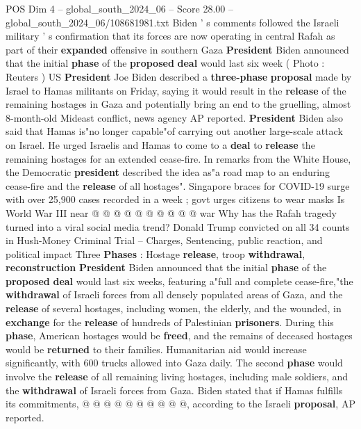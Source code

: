 \begin{textsample}{POS Dim 4 – global\_south\_2024\_06 – Score 28.00 – global\_south\_2024\_06/108681981.txt}  \label{ex:f4_pos_081}
Biden ' s comments followed the Israeli military ' s confirmation that its forces are now operating in central Rafah as part of their \textbf{expanded} offensive in southern Gaza \textbf{President} Biden announced that the initial \textbf{phase} of the \textbf{proposed} \textbf{deal} would last six week ( Photo : Reuters ) US \textbf{President} Joe Biden described a \textbf{three-phase} \textbf{proposal} made by Israel to Hamas militants on Friday, saying it would result in the \textbf{release} of the remaining hostages in Gaza and potentially bring an end to the gruelling, almost 8-month-old Mideast conflict, news agency AP reported. \textbf{President} Biden also said that Hamas is"no longer capable"of carrying out another large-scale attack on Israel.
He urged Israelis and Hamas to come to a \textbf{deal} to \textbf{release} the remaining hostages for an extended cease-fire.
In remarks from the White House, the Democratic \textbf{president} described the idea as"a road map to an enduring cease-fire and the \textbf{release} of all hostages".
Singapore braces for COVID-19 surge with over 25,900 cases recorded in a week ; govt urges citizens to wear masks Is World War III near @ @ @ @ @ @ @ @ @ @ war Why has the Rafah tragedy turned into a viral social media trend?
Donald Trump convicted on all 34 counts in Hush-Money Criminal Trial -- Charges, Sentencing, public reaction, and political impact Three \textbf{Phases} : Hostage \textbf{release}, troop \textbf{withdrawal}, \textbf{reconstruction} \textbf{President} Biden announced that the initial \textbf{phase} of the \textbf{proposed} \textbf{deal} would last six weeks, featuring a"full and complete cease-fire,"the \textbf{withdrawal} of Israeli forces from all densely populated areas of Gaza, and the \textbf{release} of several hostages, including women, the elderly, and the wounded, in \textbf{exchange} for the \textbf{release} of hundreds of Palestinian \textbf{prisoners}.
During this \textbf{phase}, American hostages would be \textbf{freed}, and the remains of deceased hostages would be \textbf{returned} to their families.
Humanitarian aid would increase significantly, with 600 trucks allowed into Gaza daily.
The second \textbf{phase} would involve the \textbf{release} of all remaining living hostages, including male soldiers, and the \textbf{withdrawal} of Israeli forces from Gaza.
Biden stated that if Hamas fulfills its commitments, @ @ @ @ @ @ @ @ @ @, according to the Israeli \textbf{proposal}, AP reported.

\end{textsample}
